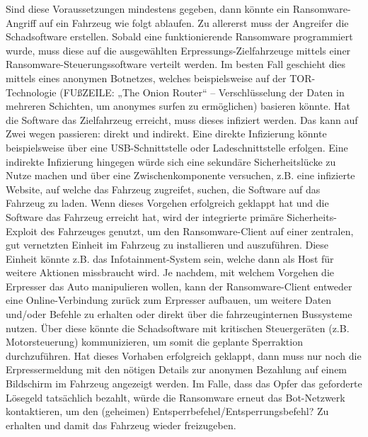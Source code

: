 Sind diese Voraussetzungen mindestens gegeben, dann könnte ein Ransomware-Angriff auf ein 
Fahrzeug wie folgt ablaufen.
\newline
Zu allererst muss der Angreifer die Schadsoftware erstellen. Sobald eine funktionierende 
Ransomware programmiert wurde, muss diese auf die ausgewählten Erpressungs-Zielfahrzeuge 
mittels einer Ransomware-Steuerungssoftware verteilt werden. Im besten Fall geschieht dies 
mittels eines anonymen Botnetzes, welches beispielsweise auf der TOR-Technologie 
(FUßZEILE: „The Onion Router“ – Verschlüsselung der Daten in mehreren Schichten, um anonymes 
surfen zu ermöglichen) basieren könnte. 
\newline
Hat die Software das Zielfahrzeug erreicht, muss dieses infiziert werden. Das kann auf Zwei 
wegen passieren: direkt und indirekt. 
\newline
Eine direkte Infizierung könnte beispielsweise über eine USB-Schnittstelle oder Ladeschnittstelle 
erfolgen. Eine indirekte Infizierung hingegen würde sich eine sekundäre Sicherheitslücke zu Nutze 
machen und über eine Zwischenkomponente versuchen, z.B. eine infizierte Website, auf welche das 
Fahrzeug zugreifet, suchen, die Software auf das Fahrzeug zu laden. 
\newline
Wenn dieses Vorgehen erfolgreich geklappt hat und die Software das Fahrzeug erreicht hat, wird 
der integrierte primäre Sicherheits-Exploit des Fahrzeuges genutzt, um den Ransomware-Client auf 
einer zentralen, gut vernetzten Einheit im Fahrzeug zu installieren und auszuführen. Diese Einheit 
könnte z.B. das Infotainment-System sein, welche dann als Host für weitere Aktionen missbraucht 
wird.
\newline
Je nachdem, mit welchem Vorgehen die Erpresser das Auto manipulieren wollen, kann der 
Ransomware-Client entweder eine Online-Verbindung zurück zum Erpresser aufbauen, um weitere 
Daten und/oder Befehle zu erhalten oder direkt über die fahrzeuginternen Bussysteme nutzen. 
Über diese könnte die Schadsoftware mit kritischen Steuergeräten (z.B. Motorsteuerung) 
kommunizieren, um somit die geplante Sperraktion durchzuführen. 
\newline
Hat dieses Vorhaben erfolgreich geklappt, dann muss nur noch die Erpressermeldung mit den 
nötigen Details zur anonymen Bezahlung auf einem Bildschirm im Fahrzeug angezeigt werden. 
Im Falle, dass das Opfer das geforderte Lösegeld tatsächlich bezahlt, würde die Ransomware 
erneut das Bot-Netzwerk kontaktieren, um den (geheimen) Entsperrbefehel/Entsperrungsbefehl? 
Zu erhalten und damit das Fahrzeug wieder freizugeben.
